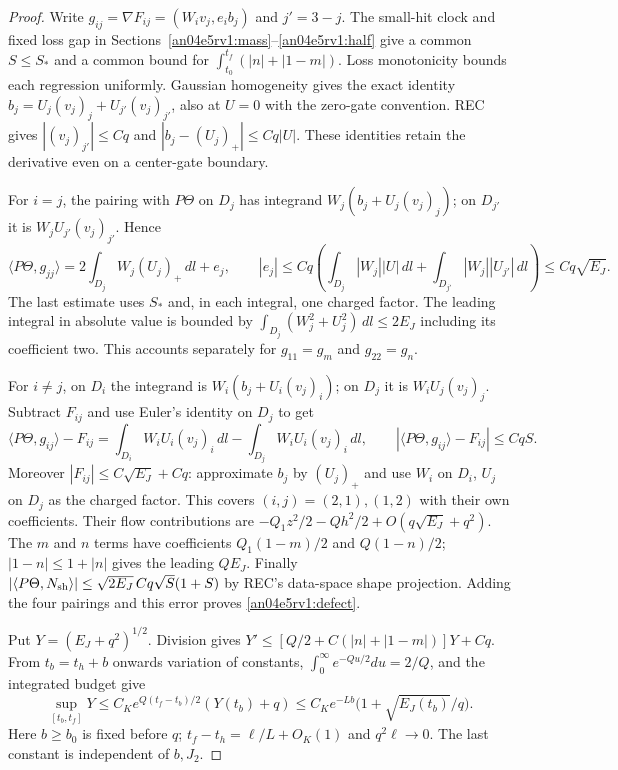 \documentclass[11pt]{article}
\newcommand{\dd}{\,dl}
\begin{document}
\begin{proof}
Write $g_{ij}=\nabla F_{ij}=(W_i v_j,e_i b_j)$ and $j'=3-j$. The small-hit clock and fixed loss gap in Sections~\ref{an04e5rv1:mass}--\ref{an04e5rv1:half} give a common $S\le S_*$ and a common bound for $\int_{t_0}^{t_f}(|n|+|1-m|)$. Loss monotonicity bounds each regression uniformly. Gaussian homogeneity gives the exact identity $b_j=U_j(v_j)_j+U_{j'}(v_j)_{j'}$, also at $U=0$ with the zero-gate convention. REC gives $|(v_j)_{j'}|\le Cq$ and $|b_j-(U_j)_+|\le Cq|U|$. These identities retain the derivative even on a center-gate boundary.

For $i=j$, the pairing with $P\Theta$ on $D_j$ has integrand
$W_j(b_j+U_j(v_j)_j)$; on $D_{j'}$ it is $W_j U_{j'}(v_j)_{j'}$. Hence
\[
 \langle P\Theta,g_{jj}\rangle
 =2\int_{D_j}W_j(U_j)_+\dd+e_j,\qquad
 |e_j|\le Cq\left(\int_{D_j}|W_j||U|\dd+
              \int_{D_{j'}}|W_j||U_{j'}|\dd\right)\le Cq\sqrt{E_J}.
\]
The last estimate uses $S_*$ and, in each integral, one charged factor. The leading integral in absolute value is bounded by $\int_{D_j}(W_j^2+U_j^2)\dd\le2E_J$ including its coefficient two. This accounts separately for $g_{11}=g_m$ and $g_{22}=g_n$.

For $i\ne j$, on $D_i$ the integrand is $W_i(b_j+U_i(v_j)_i)$; on $D_j$ it is $W_iU_j(v_j)_j$. Subtract $F_{ij}$ and use Euler's identity on $D_j$ to get
\[
 \langle P\Theta,g_{ij}\rangle-F_{ij}
 =\int_{D_i}W_iU_i(v_j)_i\dd-\int_{D_j}W_iU_i(v_j)_i\dd,\qquad
 |\langle P\Theta,g_{ij}\rangle-F_{ij}|\le CqS.
\]
Moreover $|F_{ij}|\le C\sqrt{E_J}+Cq$: approximate $b_j$ by $(U_j)_+$ and use $W_i$ on $D_i$, $U_j$ on $D_j$ as the charged factor. This covers $(i,j)=(2,1),(1,2)$ with their own coefficients. Their flow contributions are $-Q_1z^2/2-Qh^2/2+O(q\sqrt{E_J}+q^2)$. The $m$ and $n$ terms have coefficients $Q_1(1-m)/2$ and $Q(1-n)/2$; $|1-n|\le1+|n|$ gives the leading $QE_J$. Finally $|\langle P\Theta,N_{\rm sh}\rangle|\le\sqrt{2E_J}\,Cq\sqrt S(1+S)$ by REC's data-space shape projection. Adding the four pairings and this error proves \eqref{an04e5rv1:defect}.

Put $Y=(E_J+q^2)^{1/2}$. Division gives $Y'\le[Q/2+C(|n|+|1-m|)]Y+Cq$. From $t_b=t_h+b$ onwards variation of constants, $\int_0^\infty e^{-Qu/2}du=2/Q$, and the integrated budget give
\[
 \sup_{[t_b,t_f]}Y\le C_K e^{Q(t_f-t_b)/2}(Y(t_b)+q)
 \le C_K e^{-Lb}\big(1+\sqrt{E_J(t_b)}/q\big).
\]
Here $b\ge b_0$ is fixed before $q$; $t_f-t_h=\ell/L+O_K(1)$ and $q^2\ell\to0$. The last constant is independent of $b,J_2$.


\end{proof}
\end{document}
